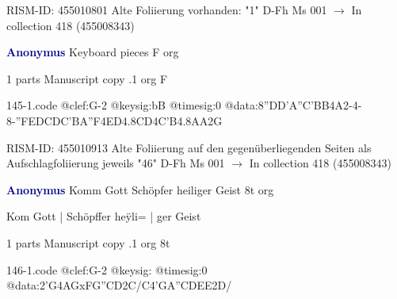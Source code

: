 \documentclass[twocolumn]{book}
\begin{document}
\newline RISM-ID: 455010801
\newline Alte Foliierung vorhanden: "1"
\newline D-Fh  Ms 001
\newline $\rightarrow$ In collection 418 (455008343)

\newline \par \vspace{7pt} \textcolor{darkblue}{\textbf{Anonymus  }}
\newline Keyboard pieces  F  
\newline org
\newline \begin{itshape}\end{itshape} 
\newline \textcolor{darkblue}{}  1 parts  
\newline Manuscript copy
.1  org  F  
\begin{filecontents*}{145-1.code}
@clef:G-2
@keysig:bB
@timesig:0
@data:{8''DD'A''C}{'BB}4A2-4-8-''F{EDCD}{C'BA''F}4ED4.8CD4C'B4.8AA2G
\end{filecontents*}
\newline
%

\newline RISM-ID: 455010913
\newline Alte Foliierung auf den gegenüberliegenden Seiten als Aufschlagfoliierung jeweils "46"
\newline D-Fh  Ms 001
\newline $\rightarrow$ In collection 418 (455008343)

\newline \par \vspace{7pt} \textcolor{darkblue}{\textbf{Anonymus  }}
\newline Komm Gott Schöpfer heiliger Geist  8t  
\newline org
\newline \begin{itshape}[f.38v, at left:] Kom Gott | Schöpffer heÿli= | ger Geist\end{itshape} 
\newline \textcolor{darkblue}{}  1 parts  
\newline Manuscript copy
.1  org  8t  
\begin{filecontents*}{146-1.code}
@clef:G-2
@keysig:
@timesig:0
@data:2'G4AGxFG''CD2C/C4'GA''CDEE2D/
\end{filecontents*}
\newline
%
\end{document}
